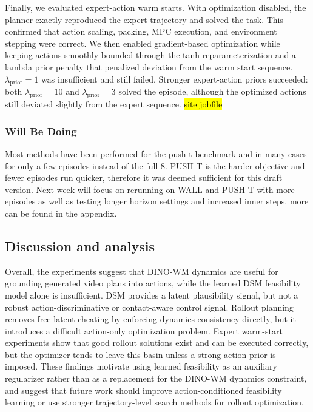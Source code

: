 {Finally, we evaluated expert-action warm starts. With optimization disabled, the planner exactly reproduced the expert trajectory and solved the task. This confirmed that action scaling, packing, MPC execution, and environment stepping were correct. We then enabled gradient-based optimization while keeping actions smoothly bounded through the tanh reparameterization and a lambda prior penalty that penalized deviation from the warm start sequence. $\lambda_{\mathrm{prior}}=1$ was insufficient and still failed. Stronger expert-action priors succeeded: both $\lambda_{\mathrm{prior}}=10$ and $\lambda_{\mathrm{prior}}=3$ solved the episode, although the optimized actions still deviated slightly from the expert sequence. \hl{site jobfile}

\subsubsection{Will Be Doing}
Most methods have been performed for the push-t benchmark and in many cases for only a few episodes instead of the full 8.  PUSH-T is the harder objective and fewer episodes run quicker, therefore it was deemed sufficient for this draft version. Next week will focus on rerunning on WALL and PUSH-T with more episodes as well as testing longer horizon settings and increased inner steps. 
more can be found in the appendix. 


\subsection{Discussion and analysis}

Overall, the experiments suggest that DINO-WM dynamics are useful for grounding generated video plans into actions, while the learned DSM feasibility model alone is insufficient. DSM provides a latent plausibility signal, but not a robust action-discriminative or contact-aware control signal. Rollout planning removes free-latent cheating by enforcing dynamics consistency directly, but it introduces a difficult action-only optimization problem. Expert warm-start experiments show that good rollout solutions exist and can be executed correctly, but the optimizer tends to leave this basin unless a strong action prior is imposed. These findings motivate using learned feasibility as an auxiliary regularizer rather than as a replacement for the DINO-WM dynamics constraint, and suggest that future work should improve action-conditioned feasibility learning or use stronger trajectory-level search methods for rollout optimization. 


}
